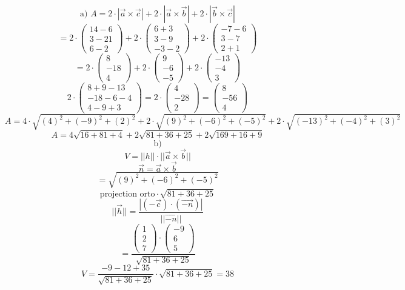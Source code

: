 \documentclass{article}
\begin{document}
\[
\text{a) } A = 2 \cdot | \vec{a} \times \vec{c}| + 2 \cdot |\vec{a} \times \vec{b}| + 2 \cdot |\vec{b} \times \vec{c}|
\]
\[
= 2 \cdot \begin{pmatrix} 14-6 \\ 3-21 \\ 6-2 \end{pmatrix} + 2 \cdot \begin{pmatrix} 6+3 \\ 3-9 \\ -3-2 \end{pmatrix} + 2 \cdot \begin{pmatrix} -7-6 \\ 3-7 \\ 2+1 \end{pmatrix}
\]
\[
= 2 \cdot \begin{pmatrix} 8 \\ -18 \\ 4 \end{pmatrix} + 2 \cdot \begin{pmatrix} 9 \\ -6 \\ -5 \end{pmatrix} + 2 \cdot \begin{pmatrix} -13 \\ -4 \\ 3 \end{pmatrix}
\]
\[
2 \cdot \begin{pmatrix} 8+9-13 \\ -18-6-4 \\ 4-9+3 \end{pmatrix} = 2 \cdot \begin{pmatrix} 4 \\ -28 \\ 2 \end{pmatrix} = \begin{pmatrix} 8 \\ -56 \\ 4 \end{pmatrix}
\]
\[
A = 4 \cdot \sqrt{(4)^2+(-9)^2+(2)^2} + 2 \cdot \sqrt{(9)^2+(-6)^2+(-5)^2} + 2 \cdot \sqrt{(-13)^2+(-4)^2+(3)^2}
\]
\[
A = 4 \sqrt{16+81+4} + 2 \sqrt{81+36+25} + 2 \sqrt{169+16+9}
\]
\[
\text{b)}
\]
\[
V = ||h|| \cdot ||\vec{a} \times \vec{b}||
\]
\[
\vec{n} = \vec{a} \times \vec{b}
\]
\[
= \sqrt{(9)^2+(-6)^2+(-5)^2}
\]
\[
\text{projection orto} \cdot \sqrt{81+36+25}
\]
\[
||\vec{h}|| = \frac{|(-\vec{c}) \cdot (\vec{-n})|}{||\vec{-n}||}
\]
\[
= \frac{\begin{pmatrix} 1 \\ 2 \\ 7 \end{pmatrix} \cdot \begin{pmatrix} -9 \\ 6 \\ 5 \end{pmatrix}}{\sqrt{81+36+25}}
\]
\[
V = \frac{-9-12+35}{\sqrt{81+36+25}} \cdot \sqrt{81+36+25} = 38
\]
\end{document}
